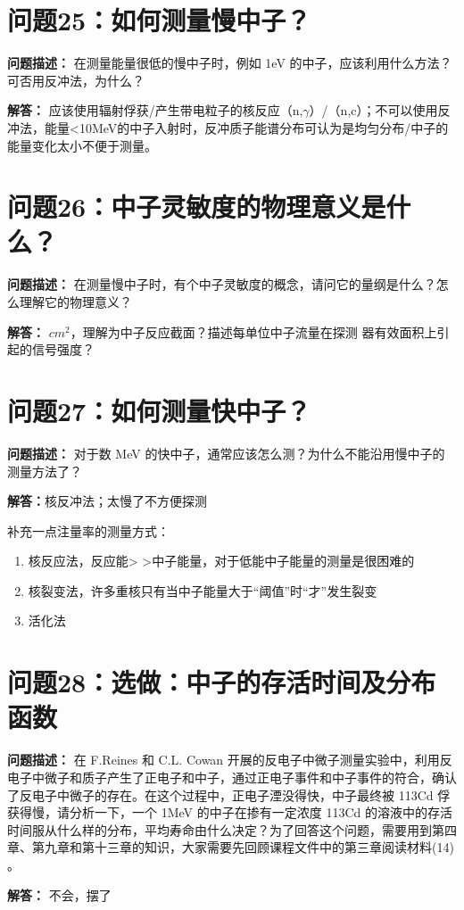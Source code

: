 \documentclass{article}
\begin{document}
\section{问题25：如何测量慢中子？}
\label{sec:prob25}

\textbf{问题描述：} 在测量能量很低的慢中子时，例如 1eV 的中子，应该利用什么方法？可否用反冲法，为什么？

\textbf{解答：} 应该使用辐射俘获/产生带电粒子的核反应（n,$\gamma$）/（n,c）；不可以使用反冲法，能量<10MeV的中子入射时，反冲质子能谱分布可认为是均匀分布/中子的能量变化太小不便于测量。

\section{问题26：中子灵敏度的物理意义是什么？}
\label{sec:prob26}

\textbf{问题描述：} 在测量慢中子时，有个中子灵敏度的概念，请问它的量纲是什么？怎么理解它的物理意义？

\textbf{解答：} $cm^2$，理解为中子反应截面？描述每单位中子流量在探测
器有效面积上引起的信号强度？

\section{问题27：如何测量快中子？}
\label{sec:prob27}

\textbf{问题描述：} 对于数 MeV 的快中子，通常应该怎么测？为什么不能沿用慢中子的测量方法了？

\textbf{解答：}核反冲法；太慢了不方便探测

补充一点注量率的测量方式：

\begin{enumerate}
    \item 核反应法，反应能> >中子能量，对于低能中子能量的测量是很困难的
    \item 核裂变法，许多重核只有当中子能量大于“阈值”时“才”发生裂变
    \item 活化法
\end{enumerate}

\section{问题28：选做：中子的存活时间及分布函数}
\label{sec:prob28}

\textbf{问题描述：} 在 F.Reines 和 C.L. Cowan 开展的反电子中微子测量实验中，利用反电子中微子和质子产生了正电子和中子，通过正电子事件和中子事件的符合，确认了反电子中微子的存在。在这个过程中，正电子湮没得快，中子最终被 113Cd 俘获得慢，请分析一下，一个 1MeV 的中子在掺有一定浓度 113Cd 的溶液中的存活时间服从什么样的分布，平均寿命由什么决定？为了回答这个问题，需要用到第四章、第九章和第十三章的知识，大家需要先回顾课程文件中的第三章阅读材料(14) 。

\textbf{解答：} 不会，摆了
\end{document}
